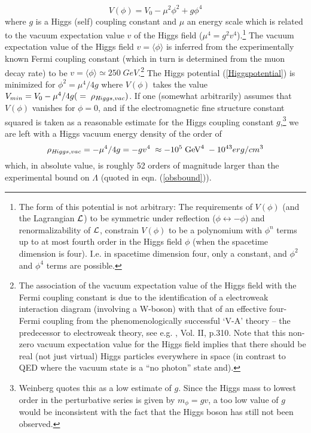 \documentclass[12pt]{article}
\begin{document}
\begin{equation} \label{Higgspotential}
V(\phi) = V_0 - \mu ^2 \phi ^2 + g\phi ^4
\end{equation}
where $g$ is a Higgs (self) coupling constant and $\mu$ an energy
scale which is related to the vacuum expectation value $v$ of the
Higgs field ($\mu ^4 = g^2 v^4$).\footnote{The form of this potential
is not arbitrary: The requirements of $V(\phi)$ (and the Lagrangian
$\cal{L}$) to be symmetric under reflection ($\phi \leftrightarrow -
\phi$) and renormalizability of $\cal{L}$, constrain
$V(\phi)$ to be a polynomium with $\phi ^n$ terms up to at most fourth
order in the Higgs field $\phi$ (when the spacetime dimension is
four). I.e.  in spacetime dimension four, only a constant, and
$\phi^2$ and $\phi^4$ terms are possible.} The vacuum expectation
value of the Higgs field $v = \langle \phi \rangle$ is inferred from the
experimentally known Fermi coupling constant (which in turn is
determined from the muon decay rate) to be $v = \langle\phi\rangle  \simeq 250 \;
GeV$.\footnote{The association of the vacuum expectation value of
the Higgs field with the Fermi coupling constant is due to the
identification of a electroweak interaction diagram (involving a
W-boson) with that of an effective four-Fermi coupling from the
phenomenologically successful `V-A' theory -- the predecessor to
electroweak theory, see e.g. \cite{weinberg96}, Vol. II, p.310.
Note that this non-zero vacuum expectation value for the Higgs
field implies that there should be real (not just virtual) Higgs
particles everywhere in space (in contrast to QED where
the vacuum state is a ``no photon'' state and).} The Higgs potential
(\ref{Higgspotential}) is minimized for 
$\phi ^2 = \mu ^4 / 4g$ where $V(\phi)$  takes the value 
$ V_{min} = V_0 - \mu ^4/4g (\; = \; \rho _{{\textit Higgs},vac})$.
If one (somewhat arbitrarily) assumes that $V(\phi)$ vanishes 
for $\phi = 0$, and if the 
electromagnetic fine structure constant
squared is taken as a reasonable estimate for the Higgs coupling constant 
$g$,\footnote{Weinberg quotes
this as a low estimate of $g$. Since the Higgs mass to lowest order in
the perturbative series is given by $m_{\phi} = gv$, a too low value
of $g$ would be inconsistent with the fact that the Higgs boson has
still not been observed.} we
are left with a Higgs vacuum energy density of the order of
$$
\rho _{{\textit Higgs},vac}= -\mu ^4/ 4g = -gv^4 \; \approx -10^5 \; 
{\mbox{GeV}} ^4 \; -10^{43} erg/cm^3
$$
which, in absolute value, is roughly 52 orders of magnitude larger than
the experimental bound on $\Lambda$ (quoted in eqn.
(\ref{obsbound})).
\end{document}
